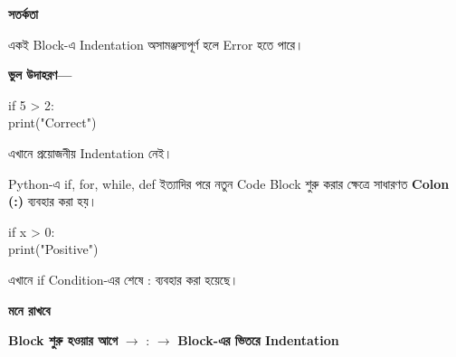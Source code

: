 \begin{rememberbox}

\textbf{\color{deepOrange}সতর্কতা}

একই Block-এ Indentation অসামঞ্জস্যপূর্ণ হলে Error হতে পারে।

\textbf{ভুল উদাহরণ—}

\begin{codebox}

\begin{english}
\ttfamily
if 5 > 2:\\
print("Correct")
\end{english}

\end{codebox}

এখানে প্রয়োজনীয় Indentation নেই।

\end{rememberbox}



Python-এ
\textenglish{\ttfamily if},
\textenglish{\ttfamily for},
\textenglish{\ttfamily while},
\textenglish{\ttfamily def}
ইত্যাদির পরে নতুন Code Block শুরু করার ক্ষেত্রে সাধারণত
\textbf{Colon (\textenglish{\ttfamily :})}
ব্যবহার করা হয়।

\begin{codebox}

\begin{english}
\ttfamily
if x > 0:\\
\hspace*{4mm}print("Positive")
\end{english}

\end{codebox}

এখানে
\textenglish{\ttfamily if}
Condition-এর শেষে
\textenglish{\ttfamily :}
ব্যবহার করা হয়েছে।

\begin{rememberbox}

\textbf{\color{deepOrange}মনে রাখবে}

\begin{center}

\textbf{Block শুরু হওয়ার আগে}
\(\longrightarrow\)
\textenglish{\ttfamily :}
\(\longrightarrow\)
\textbf{Block-এর ভিতরে Indentation}

\end{center}

\end{rememberbox}

